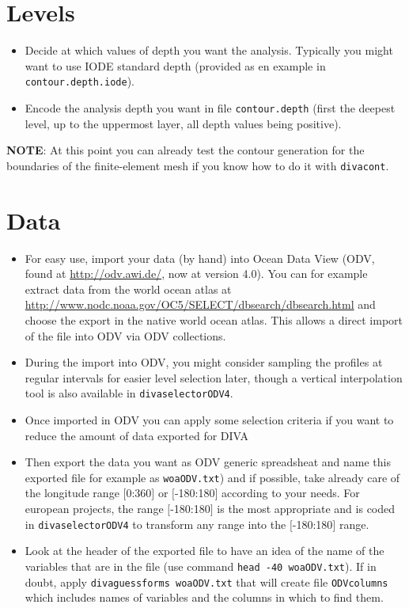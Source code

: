 \documentclass[8pt,a4paper,notitlepage]{book}
\newcommand{\diva}{DIVA}
\begin{document}
\section{Levels}

\begin{itemize}
\item Decide at which values of depth you want the analysis. Typically you might want to use IODE standard depth (provided as en example in {\tt contour.depth.iode}).
\item Encode the analysis depth you want in file {\tt contour.depth} (first the deepest level, up to the uppermost layer, all depth values being positive).
\end{itemize}

{\bf NOTE}: At this point you can already test the contour generation for the boundaries of the finite-element mesh if you know how to do it with {\tt divacont}.

\section{Data}


\begin{itemize}
\item
For easy use, import your data (by hand) into Ocean Data View (ODV, found at \url{http://odv.awi.de/}, now at version 4.0). You can for example extract data from the world ocean atlas at \url{http://www.nodc.noaa.gov/OC5/SELECT/dbsearch/dbsearch.html} and choose the export in the native world ocean atlas. This allows a direct import of the file into ODV via ODV collections.
\item During the import into ODV, you might consider sampling the profiles at regular intervals for easier level selection later, though a vertical interpolation tool is also available in {\tt divaselectorODV4}.
\item Once imported in ODV you can apply some selection criteria if you want to reduce the amount of data exported for \diva 
\item Then export the data you want as ODV generic spreadsheat and name this exported file for example as {\tt woaODV.txt}) and if possible, take already care of the longitude range  $[$0:360$]$ or $[$-180:180$]$ according to your needs. For european projects, the range $[$-180:180$]$  is the most appropriate and is coded in {\tt divaselectorODV4} to transform any range into the $[$-180:180$]$ range.
\item Look at the header of the exported file to have an idea of the name of the variables that are in the file (use command {\tt head -40 woaODV.txt}). If in doubt, apply {\tt divaguessforms woaODV.txt} that will create file {\tt ODVcolumns} which includes names of variables and the columns in which to find them.
\end{itemize}
\end{document}
